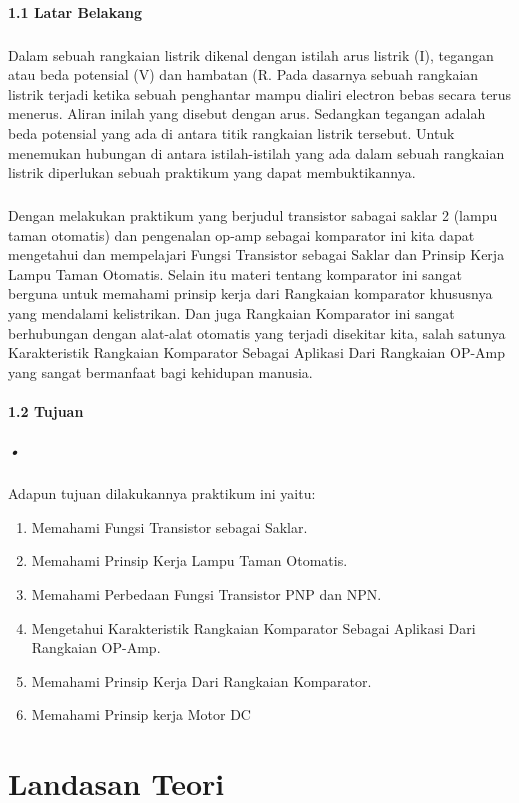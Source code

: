 \documentclass[12pt,a4paper]{article}
\begin{document}
\paragraph{1.1 Latar Belakang}
\subparagraph{ }
	Dalam sebuah rangkaian listrik dikenal dengan istilah arus listrik (I), tegangan atau beda potensial (V) dan hambatan (R. Pada dasarnya sebuah rangkaian listrik terjadi ketika sebuah penghantar mampu dialiri electron bebas secara terus menerus. Aliran inilah yang disebut dengan arus. Sedangkan tegangan adalah beda potensial yang ada di antara titik rangkaian listrik tersebut. Untuk menemukan hubungan di antara istilah-istilah yang ada dalam sebuah rangkaian listrik diperlukan sebuah praktikum yang dapat membuktikannya.
\subparagraph{ }
	Dengan melakukan praktikum yang berjudul transistor sabagai saklar 2 (lampu taman otomatis) dan pengenalan op-amp sebagai komparator ini kita dapat mengetahui dan mempelajari Fungsi Transistor sebagai Saklar dan Prinsip Kerja Lampu Taman Otomatis. Selain itu materi tentang komparator ini sangat berguna untuk memahami prinsip kerja dari Rangkaian komparator khususnya yang mendalami kelistrikan. Dan juga Rangkaian Komparator ini sangat berhubungan dengan alat-alat otomatis yang terjadi disekitar kita, salah satunya Karakteristik Rangkaian Komparator Sebagai Aplikasi Dari Rangkaian OP-Amp yang sangat bermanfaat bagi kehidupan manusia.

\paragraph{1.2 Tujuan}
\subparagraph{•}
Adapun tujuan dilakukannya praktikum ini yaitu:
\begin{enumerate}
\item Memahami Fungsi Transistor sebagai Saklar.
\item Memahami Prinsip Kerja Lampu Taman Otomatis.
\item Memahami Perbedaan Fungsi Transistor PNP dan NPN.
\item Mengetahui Karakteristik Rangkaian Komparator Sebagai Aplikasi Dari Rangkaian OP-Amp.
\item Memahami Prinsip Kerja Dari Rangkaian Komparator.
\item Memahami Prinsip kerja Motor DC
\end{enumerate}


\newpage
\section{Landasan Teori}
\end{document}
